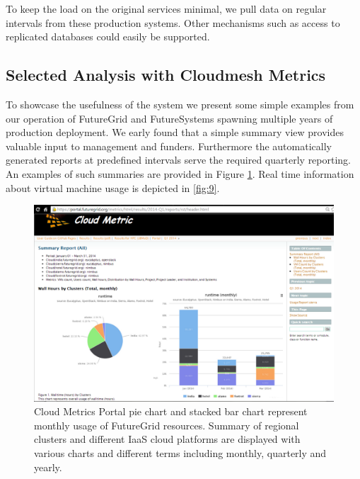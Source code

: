 \documentclass{sig-alternate-05-2015}
\begin{document}
To keep the load on the original services minimal, we pull data on
regular intervals from these production systems. Other mechanisms
such as access to replicated databases could easily be supported. 

\subsection{Selected Analysis with Cloudmesh Metrics}

To showcase the usefulness of the system we present some simple
examples from our operation of FutureGrid and FutureSystems spawning
multiple years of production deployment. We early found that a simple
summary view provides valuable input to management and funders.
Furthermore the automatically generated reports at predefined intervals
serve the required quarterly reporting. An examples of such summaries are
provided in Figure \ref{F:fig8}. Real time information about virtual
machine usage is depicted in \ref{fig:9}.

\begin{figure}[htb] 
  \centering 
    \includegraphics[width=1.0\columnwidth]{images/metrics-portal.pdf} 
  \caption{Cloud Metrics Portal pie chart and stacked bar chart represent monthly usage of FutureGrid resources. Summary of regional clusters and different IaaS cloud platforms are displayed with various charts and different terms including monthly, quarterly and yearly.}\label{F:fig8} 
\end{figure} 
\end{document}
